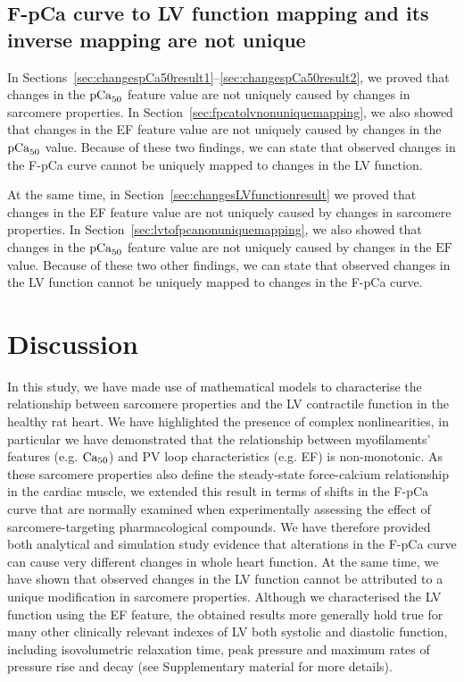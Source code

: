 %
%
%
\subsection{F-pCa curve to LV function mapping and its inverse mapping are not unique}
In Sections~\ref{sec:changespCa50result1}--\ref{sec:changespCa50result2}, we proved that changes in the $\textrm{pCa}_{50}$ feature value are not uniquely caused by changes in sarcomere properties. In Section~\ref{sec:fpcatolvnonuniquemapping}, we also showed that changes in the EF feature value are not uniquely caused by changes in the $\textrm{pCa}_{50}$ value. Because of these two findings, we can state that observed changes in the F-pCa curve cannot be uniquely mapped to changes in the LV function.

\vspace{0.2cm}
At the same time, in Section~\ref{sec:changesLVfunctionresult} we proved that changes in the EF feature value are not uniquely caused by changes in sarcomere properties. In Section~\ref{sec:lvtofpcanonuniquemapping}, we also showed that changes in the $\textrm{pCa}_{50}$ feature value are not uniquely caused by changes in the $\textrm{EF}$ value. Because of these two other findings, we can state that observed changes in the LV function cannot be uniquely mapped to changes in the F-pCa curve.


%
%
%
\section{Discussion}\label{sec:ch8discussion}

\noindent
In this study, we have made use of mathematical models to characterise the relationship between sarcomere properties and the LV contractile function in the healthy rat heart. We have highlighted the presence of complex nonlinearities, in particular we have demonstrated that the relationship between myofilaments' features (e.g. $\textrm{Ca}_{50}$) and PV loop characteristics (e.g. EF) is non-monotonic. As these sarcomere properties also define the steady-state force-calcium relationship in the cardiac muscle, we extended this result in terms of shifts in the F-pCa curve that are normally examined when experimentally assessing the effect of sarcomere-targeting pharmacological compounds. We have therefore provided both analytical and simulation study evidence that alterations in the F-pCa curve can cause very different changes in whole heart function. At the same time, we have shown that observed changes in the LV function cannot be attributed to a unique modification in sarcomere properties. Although we characterised the LV function using the EF feature, the obtained results more generally hold true for many other clinically relevant indexes of LV both systolic and diastolic function, including isovolumetric relaxation time, peak pressure and maximum rates of pressure rise and decay (see Supplementary material for more details).


